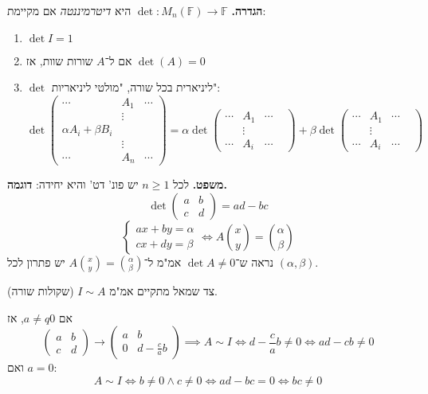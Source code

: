 \documentclass[]{article}
\newcommand\F         {\mathbb{F}}
\newcommand\co        {\colon}
\newcommand\ag        {\alpha}
\newcommand\bg        {\beta}
\begin{document}
	\textbf{הגדרה. }$\det \co M_n(\F) \to \F$ היא \textit{דיטרמיננטה} אם מקיימת: 
	\begin{enumerate}
		\item \hfil $\det I = 1$
		\item אם ל־$A$ שורות שוות, אז $\det(A) = 0$
		\item $\det$ ליניארית בכל שורה, "מולטי ליניאריות": 
		\[ \det{\begin{pmatrix}
				\cdots & A_1 & \cdots \\
				&\vdots \\
				\ag A_i  +\bg B_i \\ & \vdots \\
				\cdots & A_n & \cdots
		\end{pmatrix}} = \ag\det\begin{pmatrix}
			\cdots & A_1 & \cdots \\ &\vdots \\\cdots & A_i & \cdots &
	\end{pmatrix} + \bg\det\begin{pmatrix}
		\cdots & A_1 & \cdots \\ & \vdots \\ \cdots & A_i & \cdots &
	\end{pmatrix}  \]
	\end{enumerate}
	
	\textbf{משפט. }לכל $n \ge 1$ יש פונ' דט' והיא יחידה: 
	\textbf{דוגמה. }
	\[ \det\begin{pmatrix}a & b \\ c & d\end{pmatrix} = ad - bc \]
	\[ \begin{cases}
		ax + by = \ag \\ cx + dy = \bg 
	\end{cases} \iff A\binom{x}{y} = \binom{\ag}{\bg} \]
	נראה ש־$\det A \neq 0$ אמ"מ ל־$A\binom{x}{y} = \binom{\ag}{\bg}$ יש פתרון לכל $(\ag, \bg)$. 
	
	צד שמאל מתקיים אמ"מ $I \sim A$ (שקולות שורה). 
	
	אם $a \ne q0$, אז 
	\[ \begin{pmatrix}
		a & b \\ c & d
	\end{pmatrix} \to \begin{pmatrix}
		a & b \\ 0 & d - \frac{c}{a}b
	\end{pmatrix} \implies A \sim I \iff d - \frac{c}{a}b \neq 0 \iff ad - cb \neq 0 \]
	ואם $a = 0$: 
	\[ A \sim I \iff b \neq 0 \land c \neq 0 \iff ad - bc = 0 \iff bc \neq 0 \]
	
\end{document}
